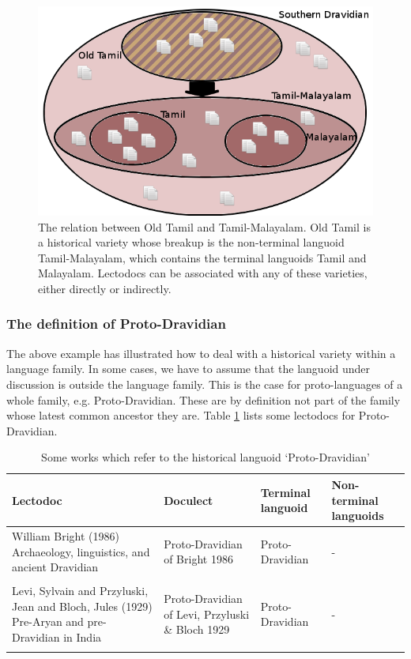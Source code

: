 \documentclass[a4paper,10pt]{article}
\begin{document}
\begin{figure}
 \includegraphics[height=.3\textheight]{dravidian.png}
\caption{The relation between Old Tamil and Tamil-Malayalam. Old Tamil is a historical variety whose breakup is the non-terminal languoid Tamil-Malayalam, which contains the terminal languoids Tamil and Malayalam. Lectodocs can be associated with any of these varieties, either directly or indirectly.}
\label{fig:dravidianbreakup}
\end{figure}

\subsubsection{The definition of Proto-Dravidian}
The above example has illustrated how to deal with a historical variety within a language family.  In some cases, we have to assume that the languoid under discussion is outside the language family. This is the case for proto-languages of a whole family, e.g. Proto-Dravidian. These are by definition not part of the family whose latest common ancestor they are. Table \ref{tab:protodravidiandocs} lists some lectodocs for Proto-Dravidian.

\begin{table}
\begin{tabular}{p{5cm}p{2cm}p{2cm}p{4cm}}
Lectodoc & Doculect & Terminal languoid & Non-terminal languoids\\ 
\hline
William Bright  (1986) Archaeology, linguistics, and ancient Dravidian
& Proto-Dravidian of Bright 1986 & Proto-Dravidian & - \\\\
Levi, Sylvain and Przyluski, Jean and Bloch, Jules  (1929) Pre-Aryan and pre-Dravidian in India
& Proto-Dravidian of Levi, Przyluski \&  Bloch 1929 & Proto-Dravidian & - \\\\
\end{tabular}
\caption{Some works which refer to the historical languoid `Proto-Dravidian'}
\label{tab:protodravidiandocs}
\end{table}
\end{document}
